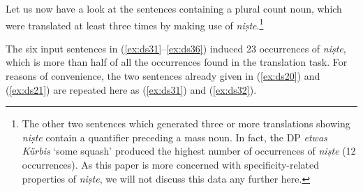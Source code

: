 \documentclass[output=paper,colorlinks,citecolor=brown]{langscibook}
\begin{document}
Let us now have a look at the sentences containing a plural count noun, which were translated at least three times by making use of \textit{niște}.\footnote{The other two sentences which generated three or more translations showing \textit{niște} contain a quantifier preceding a mass noun. In fact, the DP \textit{etwas Kürbis} ‘some squash’ produced the highest number of occurrences of \textit{niște} (12 occurrences). As this paper is more concerned with specificity-related properties of \textit{niște}, we will not discuss this data any further here.} 

The six input sentences in (\ref{ex:ds31}--\ref{ex:ds36}) induced 23 occurrences of \textit{niște}, which is more than half of all the occurrences found in the translation task. For reasons of convenience, the two sentences already given in (\ref{ex:ds20}) and (\ref{ex:ds21}) are repeated here as (\ref{ex:ds31}) and (\ref{ex:ds32}).\largerpage
\end{document}
